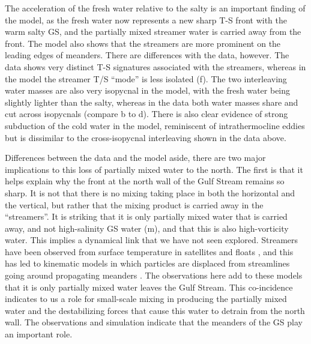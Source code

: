 \documentclass{natureJMK}
\begin{document}
The acceleration of the fresh water relative to the salty is an important finding of the model, as the fresh water now represents a new sharp T-S front with the warm salty GS, and the partially mixed streamer water is carried away from the front.  The model also shows that the streamers are more prominent on the leading edges of meanders.  There are differences with the data, however.  The data shows very distinct T-S signatures associated with the streamers, whereas in the model the streamer T/S ``mode'' is less isolated (f).  The two interleaving water masses are also very isopycnal in the model, with the fresh water being slightly lighter than the salty, whereas in the data both water masses  share and cut across isopycnals (compare b to d).   There is also clear evidence of strong subduction of the cold water in the model, reminiscent of intrathermocline eddies \cite{thomasjoyce10} but is dissimilar to the cross-isopycnal interleaving shown in the data above.    


Differences between the data and the model aside, there are two major implications to this loss of partially mixed water to the north.  The first is that it helps explain why the front at the north wall of the Gulf Stream remains so sharp.  It is not that there is no mixing taking place in both the horizontal and the vertical, but rather that the mixing product is carried away in the ``streamers''.  It is striking that it is only partially mixed water that is carried away, and not high-salinity GS water (m), and that this is also high-vorticity water.  This implies a dynamical link that we have not seen explored.  Streamers have been observed from surface temperature in satellites and floats \cite{bowerrossby89,flierletal87,lozieretal97 ,songetal95}, and this has led to kinematic models in which particles are displaced from streamlines going around propagating meanders \cite{bower91,prattetal95,lozieretal97}. The observations here add to these models that it is only partially mixed water leaves the Gulf Stream.  This co-incidence indicates to us a role for small-scale mixing in producing the partially mixed water and the destabilizing forces that cause this water to detrain from the north wall.  The observations and simulation indicate that the meanders of the GS play an important role.  
\end{document}
